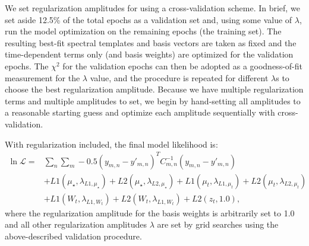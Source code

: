 \documentclass[modern]{aastex62}
\begin{document}
We set regularization amplitudes for \wobble using a cross-validation scheme. 
In brief, we set aside 12.5\% of the total epochs as a validation set and, using some value of $\lambda$, run the model optimization on the remaining epochs (the training set). 
The resulting best-fit spectral templates and basis vectors are taken as fixed and the time-dependent terms only (\RVs and basis weights) are optimized for the validation epochs. 
The $\chi^2$ for the validation epochs can then be adopted as a goodness-of-fit measurement for the $\lambda$ value, and the procedure is repeated for different $\lambda$s to choose the best regularization amplitude. 
Because we have multiple regularization terms and multiple amplitudes to set, we begin by hand-setting all amplitudes to a reasonable starting guess and optimize each amplitude sequentially with cross-validation.

With regularization included, the final model likelihood is:
\begin{equation}
\begin{split}
\ln \mathcal{L} = & \sum_{n} \sum_{m} -0.5 (y_{m,n} - y'_{m,n})^T C_{m,n}^{-1} (y_{m,n}-y'_{m,n})  \\
 & + L1(\mu_{\star}, \lambda_{L1, \mu_{\star}}) + L2(\mu_{\star}, \lambda_{L2, \mu_{\star}}) + L1(\mu_{t},  \lambda_{L1, \mu_{t}}) + L2(\mu_{t},  \lambda_{L2, \mu_{t}}) \\
 & + L1(W_t, \lambda_{L1, W_t}) + L2(W_t, \lambda_{L1, W_t}) + L2(z_t, 1.0) ,
\end{split}
\end{equation}
where the regularization amplitude for the basis weights is arbitrarily set to 1.0 and all other regularization amplitudes $\lambda$ are set by grid searches using the above-described validation procedure.  

\end{document}

